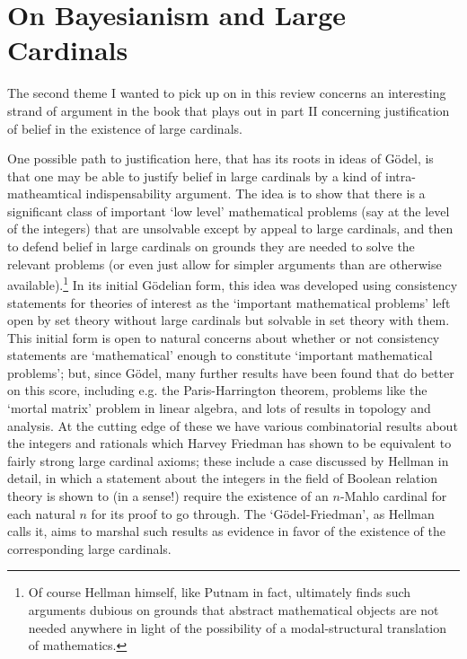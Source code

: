 \documentclass{amsart}
\theoremstyle{definition}
\begin{document}
\section{On Bayesianism and Large Cardinals}

The second theme I wanted to pick up on in this review concerns an interesting
strand of argument in the book that plays out in part II concerning justification
of belief in the existence of large cardinals. 

One possible path to justification here, that has its roots in ideas of G\"odel, 
is that one may be able to justify belief in large cardinals by 
a kind of intra-matheamtical indispensability argument. The idea is to show that there
is a significant class of important `low level' mathematical problems 
(say at the level of the integers) that are unsolvable except
by appeal to large cardinals, and then to defend belief in large cardinals 
on grounds they are needed to solve the relevant problems (or even just 
allow for simpler arguments than are otherwise available).\footnote{
    Of course Hellman himself, like Putnam in fact, 
    ultimately finds such arguments dubious on grounds 
    that abstract mathematical objects are not needed anywhere
    in light of the possibility of a modal-structural translation 
    of mathematics.
} 
In its initial G\"odelian form, this idea was developed using consistency statements 
for theories of interest as the `important mathematical problems' left open by set theory
without large cardinals but solvable in set theory with them. This initial form is 
open to natural concerns about whether or not consistency statements are `mathematical'
enough to constitute `important mathematical problems'; but, since G\"odel,
many further results have been found that do better on this score, including e.g. the 
Paris-Harrington theorem, problems like the `mortal matrix' problem in linear algebra,
and lots of results in topology and analysis. At the 
cutting edge of these we have various combinatorial results about the integers and rationals
which Harvey Friedman has shown to be equivalent to fairly strong large cardinal 
axioms; these include a case discussed by Hellman in detail, 
in which a statement about the integers in the field of Boolean relation theory 
is shown to (in a sense!) require the existence 
of an $n$-Mahlo cardinal for each natural $n$ for its proof to go through.
The `G\"odel-Friedman', as Hellman 
calls it, aims to marshal such results as evidence in favor of the existence 
of the corresponding large cardinals.
\end{document}

